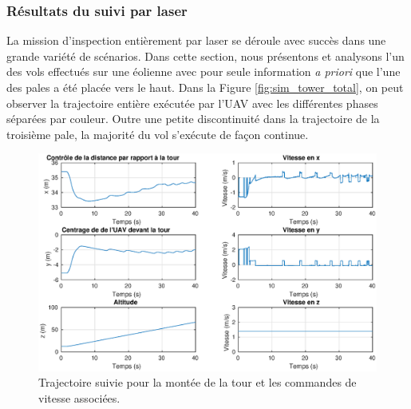 \subsubsection{Résultats du suivi par laser}

La mission d'inspection entièrement par laser se déroule avec succès dans une grande variété de scénarios. Dans cette section, nous présentons et analysons l'un des vols effectués sur une éolienne avec pour seule information \textit{a priori} que l'une des pales a été placée vers le haut. Dans la Figure \ref{fig:sim_tower_total}, on peut observer la trajectoire entière exécutée par l'UAV avec les différentes phases séparées par couleur. Outre une petite discontinuité dans la trajectoire de la troisième pale, la majorité du vol s'exécute de façon continue.
\begin{figure}[!htb]
  \centering
  \includegraphics[width=\linewidth]{images/sim_tower_ascent}
  \caption{Trajectoire suivie pour la montée de la tour et les commandes de vitesse associées.}
  \label{fig:sim_tower_ascent}
\end{figure}

